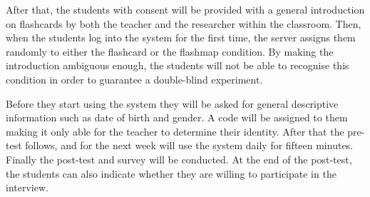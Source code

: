 \documentclass[11pt,twoside]{report} %
\begin{document}
After that, the students with consent will be provided with a general introduction on flashcards by both the teacher and the researcher within the classroom. Then, when the students log into the system for the first time, the server assigns them randomly to either the flashcard or the flashmap condition. By making the introduction ambiguous enough, the students will not be able to recognise this condition in order to guarantee a double-blind experiment.

Before they start using the system they will be asked for general descriptive information such as date of birth and gender. A code will be assigned to them making it only able for the teacher to determine their identity. After that the pre-test follows, and for the next week will use the system daily for fifteen minutes. Finally the post-test and survey will be conducted. At the end of the post-test, the students can also indicate whether they are willing to participate in the interview.
\end{document}
